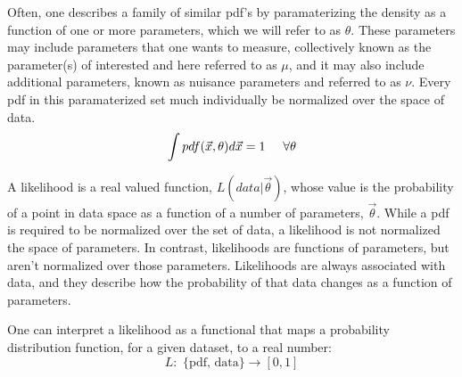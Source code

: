 Often, one describes a family of similar pdf's by paramaterizing the density as a function of one or more parameters, which we will refer to as $\theta$.
These parameters may include parameters that one wants to measure, collectively known as the parameter(s) of interested and here referred to as $\mu$, and it may also include additional parameters, known as nuisance parameters and referred to as $\nu$. %
Every pdf in this paramaterized set much individually be normalized over the space of data. 
\begin{equation}
  \int pdf(\vec{x}, \theta) d\vec{x} = 1 \hspace{5mm} \forall \theta %
\end{equation}

A likelihood is a real valued function, $L(data | \vec{\theta})$, whose value is the probability of a point in data space as a function of a number of parameters, $\vec{\theta}$.
While a pdf is required to be normalized over the set of data, a likelihood is not normalized the space of parameters.
In contrast, likelihoods are functions of parameters, but aren't normalized over those parameters.
Likelihoods are always associated with data, and they describe how the probability of that data changes as a function of parameters.

One can interpret a likelihood as a functional that maps a probability distribution function, for a given dataset, to a real number:
\begin{equation}
  L: \text{ \{pdf, data\} } \rightarrow [0, 1]%
\end{equation}


